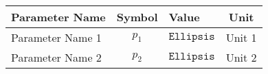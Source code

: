 \begin{tabular}{lclc}
\hline
 Parameter Name   &  Symbol  & Value                      &  Unit  \\
\hline
 Parameter Name 1 & $p_{1}$  & $\mathtt{\text{Ellipsis}}$ & Unit 1 \\
 Parameter Name 2 & $p_{2}$  & $\mathtt{\text{Ellipsis}}$ & Unit 2 \\
\hline
\end{tabular}